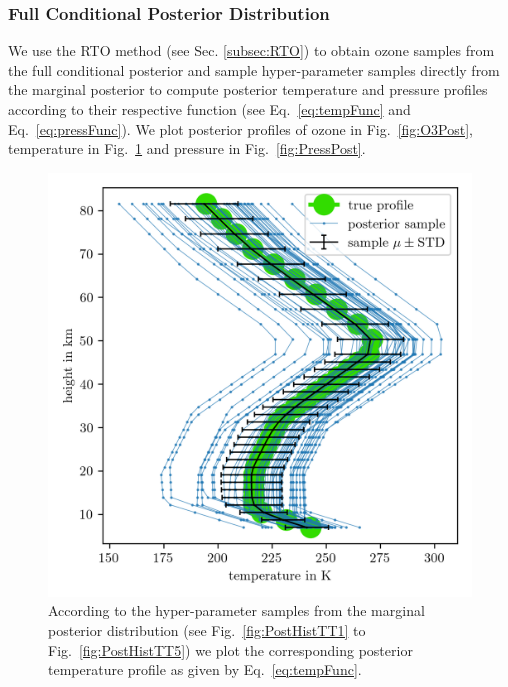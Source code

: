 \subsubsection{Full Conditional Posterior Distribution}
We use the RTO method (see Sec. \ref{subsec:RTO}) to obtain ozone samples from the full conditional posterior and sample hyper-parameter samples directly from the marginal posterior to compute posterior temperature and pressure profiles according to their respective function (see Eq.~\ref{eq:tempFunc} and Eq.~\ref{eq:pressFunc}). 
We plot posterior profiles of ozone in Fig.~\ref{fig:O3Post}, temperature in Fig.~\ref{fig:TempPost} and pressure in Fig.~\ref{fig:PressPost}.
\begin{figure}[ht!]
	\centering
	\includegraphics{TempPostMeanSigm.png} 
	\caption[Temperature posterior samples.]{According to the hyper-parameter samples from the marginal posterior distribution (see Fig.~\ref{fig:PostHistTT1} to Fig.~\ref{fig:PostHistTT5}) we plot the corresponding posterior temperature profile as given by Eq.~\ref{eq:tempFunc}. }
	\label{fig:TempPost}
\end{figure}

